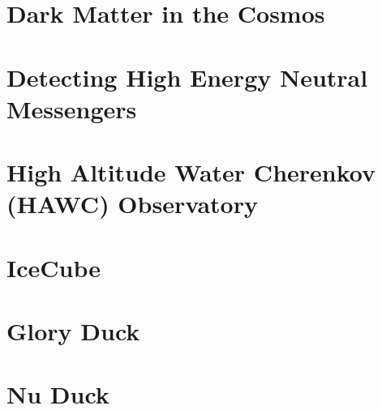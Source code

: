 \documentclass[a4paper, 12pt]{article}
\begin{document}
\section{Dark Matter in the Cosmos\label{sec:dm_cosmos}}


\section{Detecting High Energy Neutral Messengers\label{sec:multmessenger}}


\section{High Altitude Water Cherenkov (HAWC) Observatory\label{sec:hawc}}


\section{IceCube\label{sec:ice3}}

\section{Glory Duck\label{sec:glory_duck}}

\section{Nu Duck\label{sec:nu_duck}}
\end{document}
